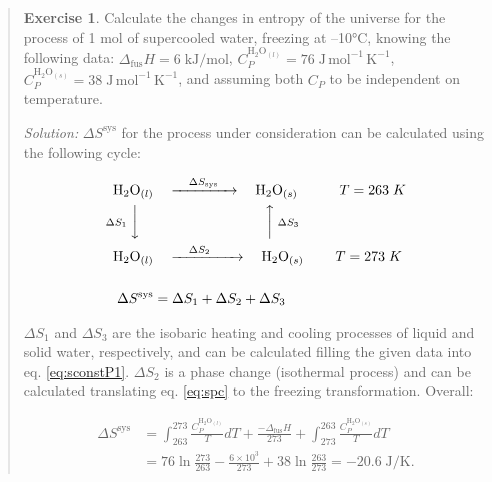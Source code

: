 \documentclass[
  9pt,
]{extbook}
\theoremstyle{definition}
\theoremstyle{definition}
\theoremstyle{definition}
\newtheorem{exercise}{Exercise}[chapter]
\theoremstyle{remark}
\begin{document}
\begin{quote}
\begin{exercise}
\protect\hypertarget{exr:supercooledEx}{}{\label{exr:supercooledEx} }Calculate the changes in entropy of the universe for the process of 1 mol of supercooled water, freezing at --10°C, knowing the following data: \(\Delta_{\mathrm{fus}}H = 6 \; \text{kJ/mol}\), \(C_P^{\mathrm{H}_2 \mathrm{O}_{(l)}}=76 \; \text{J} \, \text{mol}^{-1} \, \text{K}^{-1}\), \(C_P^{\mathrm{H}_2 \mathrm{O}_{(s)}}=38 \; \text{J} \, \text{mol}^{-1} \, \text{K}^{-1}\), and assuming both \(C_P\) to be independent on temperature.

\emph{Solution:} \(\Delta S^{\mathrm{sys}}\) for the process under consideration can be calculated using the following cycle:

\begin{equation}
\begin{aligned}
\mathrm{H}_2 \mathrm{O}_{(l)} & \quad \xrightarrow{\quad \Delta S_{\text{sys}} \quad} \quad \mathrm{H}_2 \mathrm{O}_{(s)} \qquad \quad T=263\;K\\
\scriptstyle{\Delta S_1} \; \bigg\downarrow \quad & \qquad \qquad \qquad \qquad \scriptstyle{\bigg\uparrow  \; \Delta S_3} \\
\mathrm{H}_2 \mathrm{O}_{(l)} & \quad \xrightarrow{\quad \Delta S_2 \qquad} \quad \mathrm{H}_2\mathrm{O}_{(s)} \qquad \; T=273\;K\\
\\
\Delta S^{\text{sys}} & = \Delta S_1 + \Delta S_2 + \Delta S_3
\end{aligned}
\label{eq:supercooledsyst}
\end{equation}

\(\Delta S_1\) and \(\Delta S_3\) are the isobaric heating and cooling processes of liquid and solid water, respectively, and can be calculated filling the given data into eq. \eqref{eq:sconstP1}. \(\Delta S_2\) is a phase change (isothermal process) and can be calculated translating eq. \eqref{eq:spc} to the freezing transformation. Overall:

\begin{equation}
\begin{aligned}
\Delta S^{\text{sys}} & = \int_{263}^{273} \frac{C_P^{\mathrm{H}_2 \mathrm{O}_{(l)}}}{T}dT+\frac{-\Delta_{\mathrm{fus}}H}{273}+\int_{273}^{263} \frac{C_P^{\mathrm{H}_2 \mathrm{O}_{(s)}}}{T}dT \\
& = 76 \ln \frac{273}{263} - \frac{6 \times 10^3}{273} + 38 \ln \frac{263}{273}= -20.6 \; \text{J/K}.
\end{aligned}
\label{eq:supercooledsyst2}
\end{equation}


\end{exercise}
\end{quote}
\end{document}
